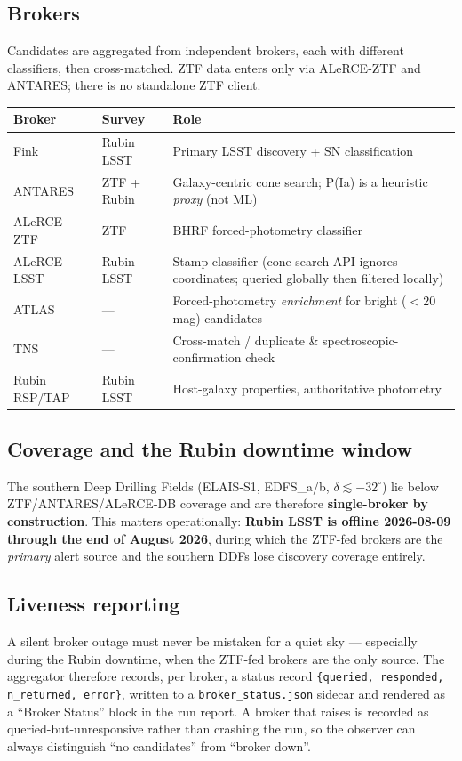 \documentclass[11pt,letterpaper]{article}
\begin{document}
\subsection{Brokers}
Candidates are aggregated from independent brokers, each with different classifiers, then
cross-matched. ZTF data enters only via ALeRCE-ZTF and ANTARES; there is no standalone ZTF
client.
\begin{center}
\begin{tabular}{@{}llp{6.7cm}@{}}
\toprule
Broker & Survey & Role \\
\midrule
Fink & Rubin LSST & Primary LSST discovery + SN classification \\
ANTARES & ZTF + Rubin & Galaxy-centric cone search; P(Ia) is a heuristic \emph{proxy} (not ML) \\
ALeRCE-ZTF & ZTF & BHRF forced-photometry classifier \\
ALeRCE-LSST & Rubin LSST & Stamp classifier (cone-search API ignores coordinates; queried globally then filtered locally) \\
ATLAS & --- & Forced-photometry \emph{enrichment} for bright ($<20$ mag) candidates \\
TNS & --- & Cross-match / duplicate \& spectroscopic-confirmation check \\
Rubin RSP/TAP & Rubin LSST & Host-galaxy properties, authoritative photometry \\
\bottomrule
\end{tabular}
\end{center}

\subsection{Coverage and the Rubin downtime window}
The southern Deep Drilling Fields (ELAIS-S1, EDFS\_a/b, $\delta \lesssim -32^\circ$) lie
below ZTF/ANTARES/ALeRCE-DB coverage and are therefore \textbf{single-broker by
construction}. This matters operationally: \textbf{Rubin LSST is offline 2026-08-09 through
the end of August 2026}, during which the ZTF-fed brokers are the \emph{primary} alert
source and the southern DDFs lose discovery coverage entirely.

\subsection{Liveness reporting}
A silent broker outage must never be mistaken for a quiet sky --- especially during the
Rubin downtime, when the ZTF-fed brokers are the only source. The aggregator therefore
records, per broker, a status record \verb|{queried, responded, n_returned, error}|, written
to a \texttt{broker\_status.json} sidecar and rendered as a ``Broker Status'' block in the
run report. A broker that raises is recorded as queried-but-unresponsive rather than crashing
the run, so the observer can always distinguish ``no candidates'' from ``broker down''.
\end{document}
